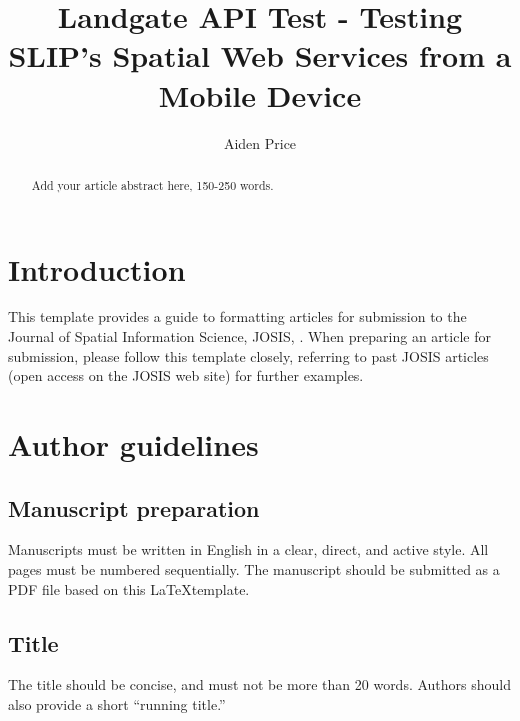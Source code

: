 \documentclass{josis}
\begin{document}


\title{Landgate API Test - Testing SLIP’s Spatial Web Services from a Mobile Device}

\author{Aiden Price}

\maketitle


\begin{abstract}
Add your article abstract here, 150-250 words. 
\end{abstract}

\section{Introduction}

This template provides a guide to formatting articles for submission to the Journal of Spatial Information Science, JOSIS, . When preparing an article for submission, please follow this template closely, referring to past JOSIS articles (open access on the JOSIS web site) for further examples. 

\section{Author guidelines}

\subsection{Manuscript preparation}
Manuscripts must be written in English in a clear, direct, and active style. All pages must be numbered sequentially. The manuscript should be submitted as a PDF file based on this \LaTeX template. 

\subsection{Title}
The title should be concise, and must not be more than 20 words. Authors should also provide a short ``running title.''
\end{document}
